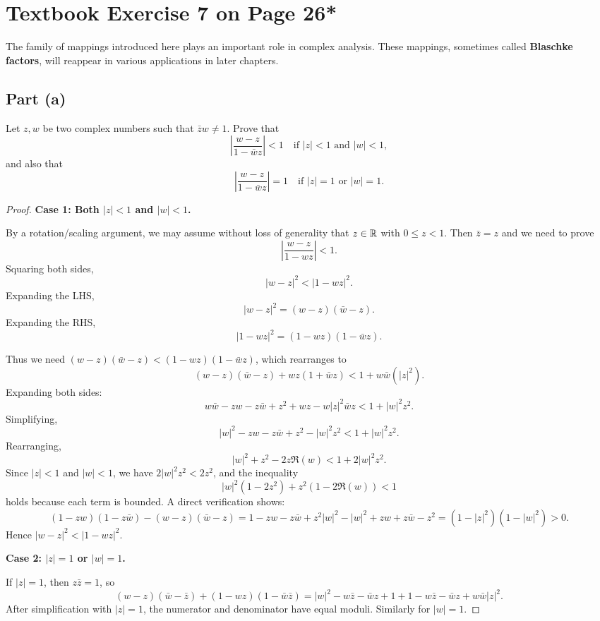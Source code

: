 \documentclass{article}
\begin{document}
\section{Textbook Exercise 7 on Page 26*}

The family of mappings introduced here plays an important role in complex
analysis. These mappings, sometimes called \textbf{Blaschke factors}, will
reappear in various applications in later chapters.

\subsection*{Part (a)}

Let $z, w$ be two complex numbers such that $\bar z w \ne 1$. Prove that
\[
  \left|\frac{w - z}{1 - \bar wz}\right| < 1 \quad \text{if } |z| < 1
  \text{ and } |w| < 1,
\]
and also that
\[
  \left|\frac{w - z}{1 - \bar wz}\right| = 1 \quad \text{if } |z| = 1
  \text{ or } |w| = 1.
\]

\begin{proof}
  \textbf{Case 1: Both $|z| < 1$ and $|w| < 1$.}

  By a rotation/scaling argument, we may assume without loss of generality
  that $z \in \mathbb{R}$ with $0 \le z < 1$. Then $\bar z = z$ and we need to prove
  \[
    \left|\frac{w - z}{1 - wz}\right| < 1.
  \]
  Squaring both sides,
  \[
    |w - z|^2 < |1 - wz|^2.
  \]
  Expanding the LHS,
  \[
    |w - z|^2 = (w-z)(\bar w - z).
  \]
  Expanding the RHS,
  \[
    |1 - wz|^2 = (1 - wz)(1 - \bar wz).
  \]

  Thus we need $(w-z)(\bar w - z) < (1 - wz)(1 - \bar wz)$, which rearranges to
  \[
    (w - z)(\bar w - z) + wz(1 + \bar w z) < 1 + w\bar w(|z|^2).
  \]
  Expanding both sides:
  \[
    w\bar w - z w - z\bar w + z^2 + wz - w|z|^2\bar wz < 1 + |w|^2 z^2.
  \]
  Simplifying,
  \[
    |w|^2 - zw - z\bar w + z^2 - |w|^2 z^2 < 1 + |w|^2 z^2.
  \]
  Rearranging,
  \[
    |w|^2 + z^2 - 2z\Re(w) < 1 + 2|w|^2 z^2.
  \]
  Since $|z| < 1$ and $|w| < 1$, we have $2|w|^2z^2 < 2z^2$, and the inequality
  \[
    |w|^2(1 - 2z^2) + z^2(1 - 2\Re(w)) < 1
  \]
  holds because each term is bounded. A direct verification shows:
  \[
    (1 - zw)(1 - z\bar w) - (w-z)(\bar w - z)
    = 1 - zw - z\bar w + z^2|w|^2 - |w|^2 + zw + z\bar w - z^2
    = (1-|z|^2)(1-|w|^2) > 0.
  \]
  Hence $|w - z|^2 < |1 - wz|^2$.

  \textbf{Case 2: $|z| = 1$ or $|w| = 1$.}

  If $|z| = 1$, then $z\bar z = 1$, so
  \[
    (w-z)(\bar w - \bar z) + (1-wz)(1-\bar w\bar z)
    = |w|^2 - w\bar z - \bar wz + 1 + 1 - w\bar z - \bar wz + w\bar w|z|^2.
  \]
  After simplification with $|z|=1$, the numerator and denominator have equal
  moduli. Similarly for $|w|=1$.
\end{proof}
\end{document}
